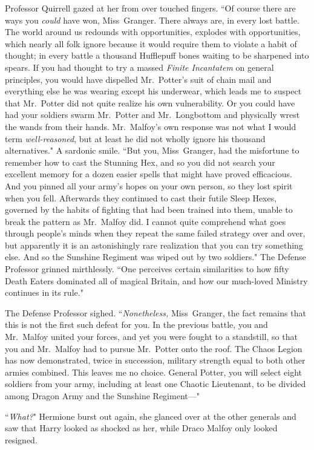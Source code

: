 Professor Quirrell gazed at her from over touched fingers. ``Of course there are ways you \emph{could} have won, Miss~Granger. There always are, in every lost battle. The world around us redounds with opportunities, explodes with opportunities, which nearly all folk ignore because it would require them to violate a habit of thought; in every battle a thousand Hufflepuff bones waiting to be sharpened into spears. If you had thought to try a massed \emph{Finite Incantatem} on general principles, you would have dispelled Mr.~Potter's suit of chain mail and everything else he was wearing except his underwear, which leads me to suspect that Mr.~Potter did not quite realize his own vulnerability. Or you could have had your soldiers swarm Mr.~Potter and Mr.~Longbottom and physically wrest the wands from their hands. Mr.~Malfoy's own response was not what I would term \emph{well-reasoned}, but at least he did not wholly ignore his thousand alternatives." A sardonic smile. ``But you, Miss~Granger, had the misfortune to remember how to cast the Stunning Hex, and so you did not search your excellent memory for a dozen easier spells that might have proved efficacious. And you pinned all your army's hopes on your own person, so they lost spirit when you fell. Afterwards they continued to cast their futile Sleep Hexes, governed by the habits of fighting that had been trained into them, unable to break the pattern as Mr.~Malfoy did. I cannot quite comprehend what goes through people's minds when they repeat the same failed strategy over and over, but apparently it is an astonishingly rare realization that you can try something else. And so the Sunshine Regiment was wiped out by two soldiers." The Defense Professor grinned mirthlessly. ``One perceives certain similarities to how fifty Death Eaters dominated all of magical Britain, and how our much-loved Ministry continues in its rule."

The Defense Professor sighed. ``\emph{Nonetheless,} Miss~Granger, the fact remains that this is not the first such defeat for you. In the previous battle, you and Mr.~Malfoy united your forces, and yet you were fought to a standstill, so that you and Mr.~Malfoy had to pursue Mr.~Potter onto the roof. The Chaos Legion has now demonstrated, twice in succession, military strength equal to both other armies combined. This leaves me no choice. General Potter, you will select eight soldiers from your army, including at least one Chaotic Lieutenant, to be divided among Dragon Army and the Sunshine Regiment---"

``\emph{What?}" Hermione burst out again, she glanced over at the other generals and saw that Harry looked as shocked as her, while Draco Malfoy only looked resigned.

